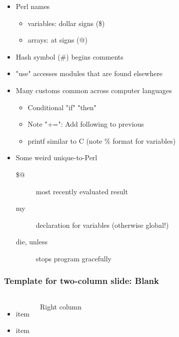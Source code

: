 \documentclass[English]{beamer}
\begin{document}
\begin{frame}
\begin{itemize}
\item Perl names 
  \begin{itemize}
  \item variables: dollar signs (\$)
  \item arrays: at signs (@)
  \end{itemize}
\item Hash symbol (\#) begins comments
\item "use" accesses modules that are found elsewhere
\item Many customs common across computer languages
  \begin{itemize}
  \item Conditional "if" "then"
  \item Note "+=": Add following to previous
  \item printf similar to C (note \% format for variables)
  \end{itemize}
\item Some weird unique-to-Perl
  \begin{description}
  \item[\$@] most recently evaluated result
  \item[my] declaration for variables (otherwise global!)
  \item[die, unless] stops program gracefully
  \end{description}
\end{itemize}
\end{frame}



\begin{frame}
  \frametitle{Template for two-column slide: Blank}
  \begin{columns}
    \column{5cm}
  \begin{itemize}
  \item item
  \item item
  \end{itemize} 
  \column{6cm}
    Right column
   \end{columns}
\end{frame}




\end{document}

